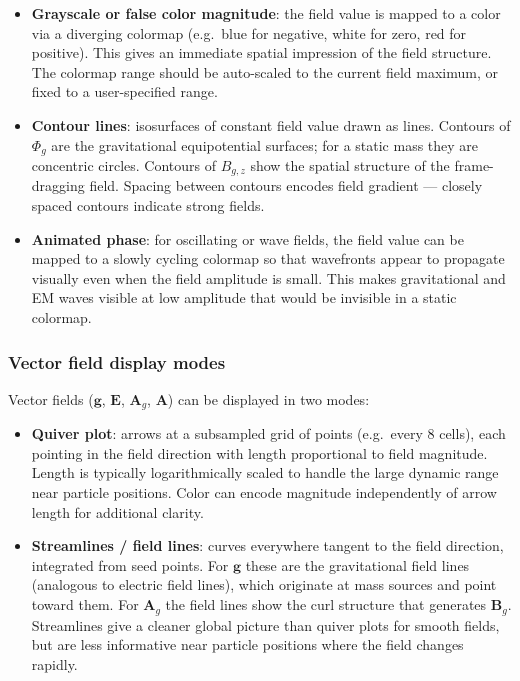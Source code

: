 \documentclass[11pt,a4paper]{article}
\newcommand{\vv}[1]{\mathbf{#1}}
\newcommand{\Phig}{\Phi_g}
\newcommand{\Ag}{\vv{A}_g}
\begin{document}
\begin{itemize}
  \item \textbf{Grayscale or false color magnitude}: the field value is mapped to a color via a diverging colormap (e.g.\ blue for negative, white for zero, red for positive).  This gives an immediate spatial impression of the field structure.  The colormap range should be auto-scaled to the current field maximum, or fixed to a user-specified range.

  \item \textbf{Contour lines}: isosurfaces of constant field value drawn as lines.  Contours of $\Phig$ are the gravitational equipotential surfaces; for a static mass they are concentric circles.  Contours of $B_{g,z}$ show the spatial structure of the frame-dragging field.  Spacing between contours encodes field gradient --- closely spaced contours indicate strong fields.

  \item \textbf{Animated phase}: for oscillating or wave fields, the field value can be mapped to a slowly cycling colormap so that wavefronts appear to propagate visually even when the field amplitude is small.  This makes gravitational and EM waves visible at low amplitude that would be invisible in a static colormap.
\end{itemize}

\subsubsection*{Vector field display modes}

Vector fields ($\vv{g}$, $\vv{E}$, $\Ag$, $\vv{A}$) can be displayed in two modes:

\begin{itemize}
  \item \textbf{Quiver plot}: arrows at a subsampled grid of points (e.g.\ every 8 cells), each pointing in the field direction with length proportional to field magnitude.  Length is typically logarithmically scaled to handle the large dynamic range near particle positions.  Color can encode magnitude independently of arrow length for additional clarity.

  \item \textbf{Streamlines / field lines}: curves everywhere tangent to the field direction, integrated from seed points.  For $\vv{g}$ these are the gravitational field lines (analogous to electric field lines), which originate at mass sources and point toward them.  For $\Ag$ the field lines show the curl structure that generates $\vv{B}_g$.  Streamlines give a cleaner global picture than quiver plots for smooth fields, but are less informative near particle positions where the field changes rapidly.
\end{itemize}
\end{document}
